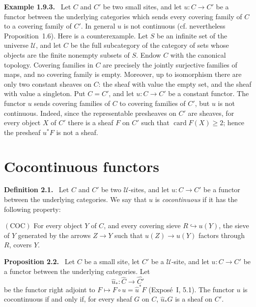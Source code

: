 \documentclass[11pt]{article}
\newcommand{\U}{\mathcal{U}}
\newenvironment{statement}[1]{\par\medskip\noindent\textbf{#1.}\ }{\par\medskip}
\newenvironment{remarktext}[1]{\par\medskip\noindent\textbf{#1.}\ }{\par\medskip}
\begin{document}
\begin{remarktext}{Example 1.9.3}
Let \(C\) and \(C'\) be two small sites, and let \(u:C\to C'\) be a functor between the underlying categories which sends every covering family of \(C\) to a covering family of \(C'\). In general \(u\) is not continuous (cf. nevertheless Proposition~1.6). Here is a counterexample. Let \(S\) be an infinite set of the universe \(\U\), and let \(C\) be the full subcategory of the category of sets whose objects are the finite nonempty subsets of \(S\). Endow \(C\) with the canonical topology. Covering families in \(C\) are precisely the jointly surjective families of maps, and no covering family is empty. Moreover, up to isomorphism there are only two constant sheaves on \(C\): the sheaf with value the empty set, and the sheaf with value a singleton. Put \(C=C'\), and let \(u:C\to C'\) be a constant functor. The functor \(u\) sends covering families of \(C\) to covering families of \(C'\), but \(u\) is not continuous. Indeed, since the representable presheaves on \(C'\) are sheaves, for every object \(X\) of \(C'\) there is a sheaf \(F\) on \(C'\) such that \(\operatorname{card}F(X)\ge 2\); hence the presheaf \(u^*F\) is not a sheaf.
\end{remarktext}

\section{Cocontinuous functors}

\begin{statement}{Definition 2.1}
Let \(C\) and \(C'\) be two \(\U\)-sites, and let \(u:C\to C'\) be a functor between the underlying categories. We say that \(u\) is \emph{cocontinuous} if it has the following property:

\((\mathrm{COC})\) For every object \(Y\) of \(C\), and every covering sieve \(R\hookrightarrow u(Y)\), the sieve of \(Y\) generated by the arrows \(Z\to Y\) such that \(u(Z)\to u(Y)\) factors through \(R\), covers \(Y\).
\end{statement}

\begin{statement}{Proposition 2.2}
Let \(C\) be a small site, let \(C'\) be a \(\U\)-site, and let \(u:C\to C'\) be a functor between the underlying categories. Let
\[
\widehat u_*:\widehat C\longrightarrow\widehat{C'}
\]
be the functor right adjoint to \(F\mapsto F\circ u=\widehat u^*F\) (Expos\'e~I, 5.1). The functor \(u\) is cocontinuous if and only if, for every sheaf \(G\) on \(C\), \(\widehat u_*G\) is a sheaf on \(C'\).
\end{statement}
\end{document}
